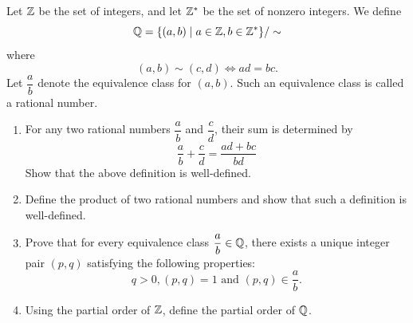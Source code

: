 
Let $\mathbb Z$ be the set of integers, and let $\mathbb Z^\ast$ be the set of nonzero integers. We define
\[ \mathbb Q = \{(a, b) \mid a \in \mathbb Z, b \in \mathbb Z^\ast\}/\sim \]
where
\[ (a, b) \sim (c, d) \iff ad = bc.\]
Let $\dfrac{a}{b}$ denote the equivalence class for $(a,b)$. Such an equivalence class is called a rational number.
\begin{enumerate}[label=(\alph*)]
\item For any two rational numbers $\dfrac{a}{b}$ and $\dfrac{c}{d}$, their sum is determined by
\[ \frac{a}{b}+\frac{c}{d}=\frac{ad+bc}{bd} \]
Show that the above definition is well-defined.

\item Define the product of two rational numbers and show that such a definition is well-defined.

\item Prove that for every equivalence class $\dfrac{a}{b} \in \mathbb Q$, there exists a unique integer pair $(p,q)$ satisfying the following properties:
\[ q>0, (p,q) = 1 \text{ and } (p,q) \in \frac{a}{b}.\]

\item Using the partial order of $\mathbb Z$, define the partial order of $\mathbb Q$.
\end{enumerate}


